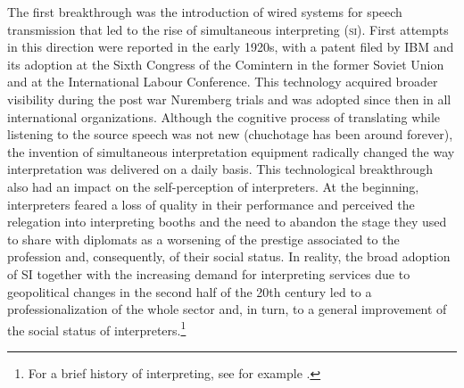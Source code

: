 \documentclass[output=paper]{langsci/langscibook}
\begin{document}
The first breakthrough was the introduction of wired systems for speech transmission that led to the rise of simultaneous interpreting (\textsc{si}). First attempts in this direction were reported in the early 1920s, with a patent filed by IBM and its adoption at the Sixth Congress of the Comintern in the former Soviet Union and at the International Labour Conference. This technology acquired broader visibility during the post war Nuremberg trials and was adopted since then in all international organizations. Although the cognitive process of translating while listening to the source speech was not new (chuchotage has been around forever), the invention of simultaneous interpretation equipment radically changed the way interpretation was delivered on a daily basis. This technological breakthrough also had an impact on the self-perception of interpreters. At the beginning, interpreters feared a loss of quality in their performance and perceived the relegation into interpreting booths and the need to abandon the stage they used to share with diplomats as a worsening of the prestige associated to the profession and, consequently, of their social status. In reality, the broad adoption of SI together with the increasing demand for interpreting services due to geopolitical changes in the second half of the 20th century led to a professionalization of the whole sector and, in turn, to a general improvement of the social status of interpreters.\footnote{For a brief history of interpreting, see for example \citep{takeda_new_2016}.} 
 
\end{document}
